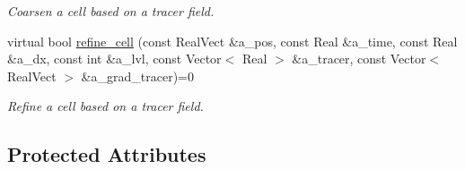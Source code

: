 \begin{DoxyCompactItemize}
\begin{DoxyCompactList}\small\item\em Coarsen a cell based on a tracer field. \end{DoxyCompactList}\item 
virtual bool \hyperlink{classfull__tagger_abdf06de73c8f54f062949f2519655981}{refine\+\_\+cell} (const Real\+Vect \&a\+\_\+pos, const Real \&a\+\_\+time, const Real \&a\+\_\+dx, const int \&a\+\_\+lvl, const Vector$<$ Real $>$ \&a\+\_\+tracer, const Vector$<$ Real\+Vect $>$ \&a\+\_\+grad\+\_\+tracer)=0
\begin{DoxyCompactList}\small\item\em Refine a cell based on a tracer field. \end{DoxyCompactList}\end{DoxyCompactItemize}
\subsection*{Protected Attributes}
